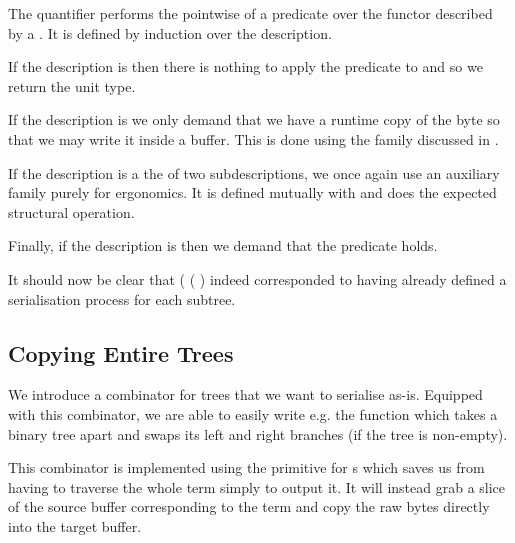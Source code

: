 The  quantifier performs the pointwise of a predicate over
the functor described by a . It is defined by induction over
the description.


If the description is  then there is nothing to apply
the predicate to and so we return the unit type.

If the description is  we only demand that we have a runtime
copy of the byte so that we may write it inside a buffer. This is done using
the  family discussed in .

If the description is a the  of two subdescriptions, we once
again use an auxiliary family purely for ergonomics. It is defined mutually
with  and does the expected structural operation.


Finally, if the description is  then we demand that the
predicate holds.


It should now be clear that
( \IdrisKeyword{(} \IdrisKeyword{)}
( \IdrisKeyword{)}) indeed corresponded
to having already defined a serialisation process for each subtree.

\subsection{Copying Entire Trees}

We introduce a  combinator for trees that we want to
serialise as-is.
%
Equipped with this combinator, we are able to easily write e.g.
the  function which takes a binary tree apart
and swaps its left and right branches (if the tree is non-empty).



This combinator is implemented using the  primitive
for s which saves us from having to traverse the whole term
simply to output it.
%
It will instead grab a slice of the source buffer corresponding to the term
and copy the raw bytes directly into the target buffer.


